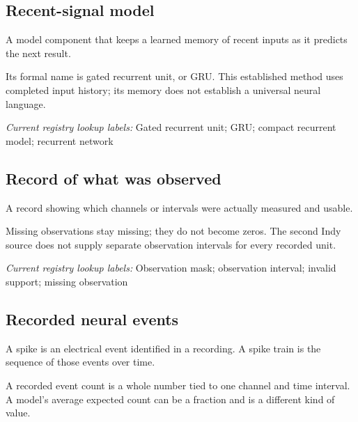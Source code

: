 \begin{samepage}
\subsection*{Recent-signal model}
\noindent A model component that keeps a learned memory of recent inputs as it predicts the next result.\par
\end{samepage}
\begin{samepage}
\noindent Its formal name is gated recurrent unit, or GRU. This established method uses completed input history; its memory does not establish a universal neural language.\par\nopagebreak[4]

\end{samepage}


\noindent\textit{Current registry lookup labels:} Gated recurrent unit; GRU; compact recurrent model; recurrent network\par

\begin{samepage}
\subsection*{Record of what was observed}
\noindent A record showing which channels or intervals were actually measured and usable.\par
\end{samepage}
\begin{samepage}
\noindent Missing observations stay missing; they do not become zeros. The second Indy source does not supply separate observation intervals for every recorded unit.\par\nopagebreak[4]

\end{samepage}


\noindent\textit{Current registry lookup labels:} Observation mask; observation interval; invalid support; missing observation\par

\begin{samepage}
\subsection*{Recorded neural events}
\noindent A spike is an electrical event identified in a recording. A spike train is the sequence of those events over time.\par
\end{samepage}
\begin{samepage}
\noindent A recorded event count is a whole number tied to one channel and time interval. A model’s average expected count can be a fraction and is a different kind of value.\par\nopagebreak[4]

\end{samepage}


